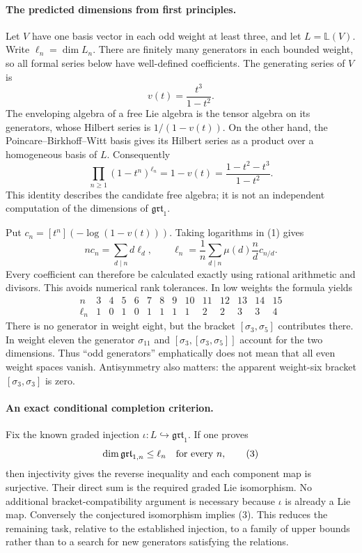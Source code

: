 \documentclass[11pt]{article}
\begin{document}
\paragraph{The predicted dimensions from first principles.}
Let $V$ have one basis vector in each odd weight at least three, and let
$L=\mathbb L(V)$. Write $\ell_n=\dim L_n$. There are finitely many
generators in each bounded weight, so all formal series below have
well-defined coefficients. The generating series of $V$ is
\[
 v(t)=\frac{t^3}{1-t^2}.
\]
The enveloping algebra of a free Lie algebra is the tensor algebra on
its generators, whose Hilbert series is $1/(1-v(t))$. On the other hand,
the Poincare--Birkhoff--Witt basis gives its Hilbert series as a product
over a homogeneous basis of $L$. Consequently
\[
 \prod_{n\ge1}(1-t^n)^{\ell_n}
 =1-v(t)=\frac{1-t^2-t^3}{1-t^2}.                 \tag{1}
\]
This identity describes the candidate free algebra; it is not an
independent computation of the dimensions of $\mathfrak{grt}_1$.

Put $c_n=[t^n](-\log(1-v(t)))$. Taking logarithms in (1) gives
\[
 nc_n=\sum_{d\mid n}d\ell_d,\qquad
 \ell_n=\frac1n\sum_{d\mid n}\mu(d)\frac nd c_{n/d}.
                                                        \tag{2}
\]
Every coefficient can therefore be calculated exactly using rational
arithmetic and divisors. This avoids numerical rank tolerances. In low
weights the formula yields
\[
\begin{array}{c|rrrrrrrrrrrrr}
n&3&4&5&6&7&8&9&10&11&12&13&14&15\\\hline
\ell_n&1&0&1&0&1&1&1&1&2&2&3&3&4
\end{array}
\]
There is no generator in weight eight, but the bracket
$[\sigma_3,\sigma_5]$ contributes there. In weight eleven the generator
$\sigma_{11}$ and $[\sigma_3,[\sigma_3,\sigma_5]]$ account for the two
dimensions. Thus ``odd generators'' emphatically does not mean that all
even weight spaces vanish. Antisymmetry also matters: the apparent
weight-six bracket $[\sigma_3,\sigma_3]$ is zero.

\paragraph{An exact conditional completion criterion.}
Fix the known graded injection $\iota:L\hookrightarrow\mathfrak{grt}_1$.
If one proves
\[
 \dim\mathfrak{grt}_{1,n}\le\ell_n\quad\hbox{for every }n,
                                                        \tag{3}
\]
then injectivity gives the reverse inequality and each component map is
surjective. Their direct sum is the required graded Lie isomorphism.
No additional bracket-compatibility argument is necessary because
$\iota$ is already a Lie map. Conversely the conjectured isomorphism
implies (3). This reduces the remaining task, relative to the established
injection, to a family of upper bounds rather than to a search for new
generators satisfying the relations.
\end{document}
